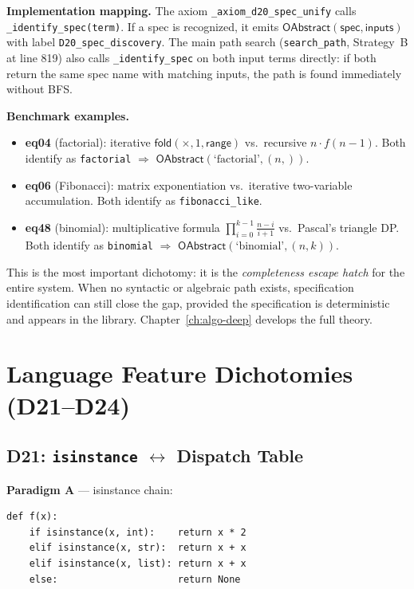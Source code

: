 \documentclass[11pt,a4paper]{report}
\theoremstyle{definition}
\theoremstyle{plain}
\newcommand{\fold}{\mathsf{fold}}
\begin{document}
\textbf{Implementation mapping.}
The axiom \texttt{\_axiom\_d20\_spec\_unify} calls
\texttt{\_identify\_spec(term)}.  If a spec is recognized, it emits
$\mathsf{OAbstract}(\mathsf{spec}, \mathsf{inputs})$ with label
\texttt{D20\_spec\_discovery}.  The main path search
(\texttt{search\_path}, Strategy~B at line 819) also calls
\texttt{\_identify\_spec} on both input terms directly: if both
return the same spec name with matching inputs, the path is found
immediately without BFS.

\textbf{Benchmark examples.}
\begin{itemize}
  \item \textbf{eq04} (factorial): iterative $\fold(\times, 1,
    \mathsf{range})$ vs.\ recursive $n \cdot f(n{-}1)$.
    Both identify as \texttt{factorial} $\Rightarrow$
    $\mathsf{OAbstract}(\text{`factorial'}, (n,))$.
  \item \textbf{eq06} (Fibonacci): matrix exponentiation vs.\
    iterative two-variable accumulation.
    Both identify as \texttt{fibonacci\_like}.
  \item \textbf{eq48} (binomial): multiplicative formula
    $\prod_{i=0}^{k-1} \frac{n-i}{i+1}$ vs.\ Pascal's triangle DP.
    Both identify as \texttt{binomial} $\Rightarrow$
    $\mathsf{OAbstract}(\text{`binomial'}, (n, k))$.
\end{itemize}

This is the most important dichotomy: it is the \emph{completeness
escape hatch} for the entire system.  When no syntactic or algebraic
path exists, specification identification can still close the gap,
provided the specification is deterministic and appears in the
library.  Chapter~\ref{ch:algo-deep} develops the full theory.


\chapter{Language Feature Dichotomies (D21--D24)}
\label{ch:lf-dichotomies}

\section{D21: \texttt{isinstance} $\leftrightarrow$ Dispatch Table}

\textbf{Paradigm A} --- isinstance chain:
\begin{lstlisting}
def f(x):
    if isinstance(x, int):    return x * 2
    elif isinstance(x, str):  return x + x
    elif isinstance(x, list): return x + x
    else:                     return None
\end{lstlisting}
\end{document}
